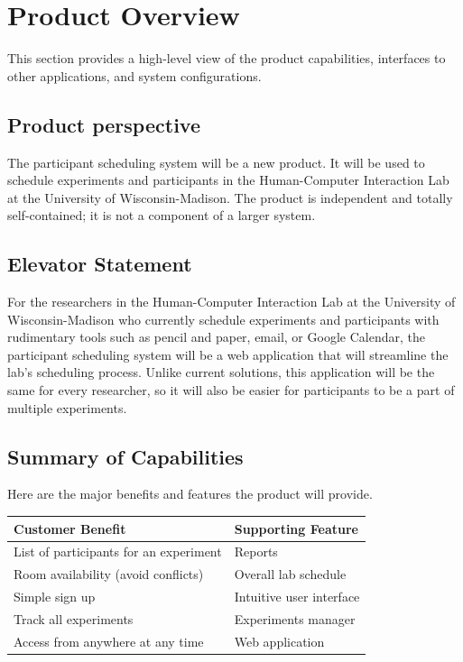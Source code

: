 \section{Product Overview}
This section provides a high-level view of the product capabilities, interfaces to other applications, and system configurations.

\subsection{Product perspective}
The participant scheduling system will be a new product. It will be used to schedule experiments and participants in the Human-Computer Interaction Lab at the University of Wisconsin-Madison. The product is independent and totally self-contained; it is not a component of a larger system.

\subsection{Elevator Statement}
For the researchers in the Human-Computer Interaction Lab at the University of Wisconsin-Madison who currently schedule experiments and participants with rudimentary tools such as pencil and paper, email, or Google Calendar, the participant scheduling system will be a web application that will streamline the lab's scheduling process. Unlike current solutions, this application will be the same for every researcher, so it will also be easier for participants to be a part of multiple experiments.

\subsection{Summary of Capabilities}
Here are the major benefits and features the product will provide.
\begin{table}[!h]
    \begin{tabular}{|l|l|}
        \hline
        Customer Benefit & Supporting Feature \\ \hline
        List of participants for an experiment & Reports \\ \hline
        Room availability (avoid conflicts) & Overall lab schedule \\ \hline
        Simple sign up & Intuitive user interface \\ \hline
        Track all experiments & Experiments manager \\ \hline
        Access from anywhere at any time & Web application \\ \hline
    \end{tabular}
\end{table}
